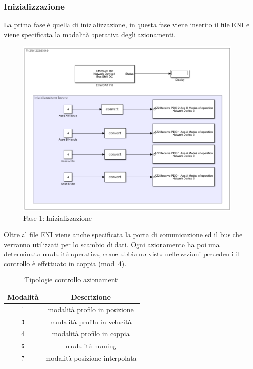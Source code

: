 \subsubsection*{Inizializzazione}
La prima fase è quella di inizializzazione, in questa fase viene inserito il file ENI e viene specificata la modalità operativa degli azionamenti.
\begin{figure}[ht]
	\begin{center}
		\includegraphics[scale=0.63]{Immagini/Sperimentale/Inizializzazione}
		\caption{Fase 1: Inizializzazione}
		\label{fig:Init}
	\end{center}
\end{figure}
Oltre al file ENI viene anche specificata la porta di comunicazione ed il bus che verranno utilizzati per lo scambio di dati. Ogni azionamento ha poi una determinata modalità operativa, come abbiamo visto nelle sezioni precedenti il controllo è effettuato in coppia (mod. 4). 
\begin{table}[h!]
	\centering
	\begin{tabular}{|c |c|} 
		\hline
		Modalità & Descrizione  \\ 
		\hline
		1 & modalità profilo in posizione  \\ 
		3 & modalità profilo in velocità  \\
		4 & modalità profilo in coppia   \\
		6 & modalità homing \\
		7 & modalità posizione interpolata\\
		\hline
	\end{tabular}
	\caption{Tipologie controllo azionamenti}
	\label{table:5}
\end{table}

